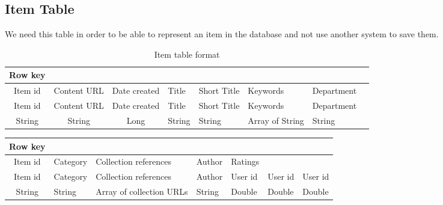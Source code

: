 \subsection{Item Table}
\label{sec:item-table}
We need this table in order to be able to represent an item in the database and not use another system to save them.
\begin{table}[h]
\centering
\caption{Item table format}
\label{item-table-format}
\begin{tabular}{@{}ccccllll@{}}
Row key &  &  &  &  &  &  &  \\ \toprule
Item id & \multicolumn{1}{c}{Content URL} & \multicolumn{1}{c}{Date created} & \multicolumn{1}{l}{Title} & \multicolumn{1}{l}{Short Title} & \multicolumn{1}{l}{Keywords} & \multicolumn{1}{l}{Department} \\ 
Item id & \multicolumn{1}{c}{Content URL} & \multicolumn{1}{c}{Date created} & \multicolumn{1}{l}{Title} & \multicolumn{1}{l}{Short Title} & \multicolumn{1}{l}{Keywords} & \multicolumn{1}{l}{Department} \\ 
String & \multicolumn{1}{c}{String} & \multicolumn{1}{c}{Long} & \multicolumn{1}{l}{String} & \multicolumn{1}{l}{String} & \multicolumn{1}{l}{Array of String} & \multicolumn{1}{l}{String} \\ 
\end{tabular}
\end{table}

\begin{table}[h]
\centering
\label{item-tabel-format-two}
\begin{tabular}{@{}cllllll@{}}
Row key &  &  &  &  &  &  \\ \toprule
Item id & \multicolumn{1}{l}{Category} & \multicolumn{1}{l}{Collection references} & \multicolumn{1}{l}{Author} & \multicolumn{1}{l}{Ratings} & \multicolumn{1}{l}{} & \multicolumn{1}{l}{} \\ 
Item id & \multicolumn{1}{l}{Category} & \multicolumn{1}{l}{Collection references} & \multicolumn{1}{l}{Author} & \multicolumn{1}{l}{User id} & \multicolumn{1}{l}{User id} & \multicolumn{1}{l}{User id} \\ 
String & \multicolumn{1}{l}{String} & \multicolumn{1}{l}{Array of collection URLs} & \multicolumn{1}{l}{String} & \multicolumn{1}{l}{Double} & \multicolumn{1}{l}{Double} & \multicolumn{1}{l}{Double} \\ 
\end{tabular}
\end{table}

